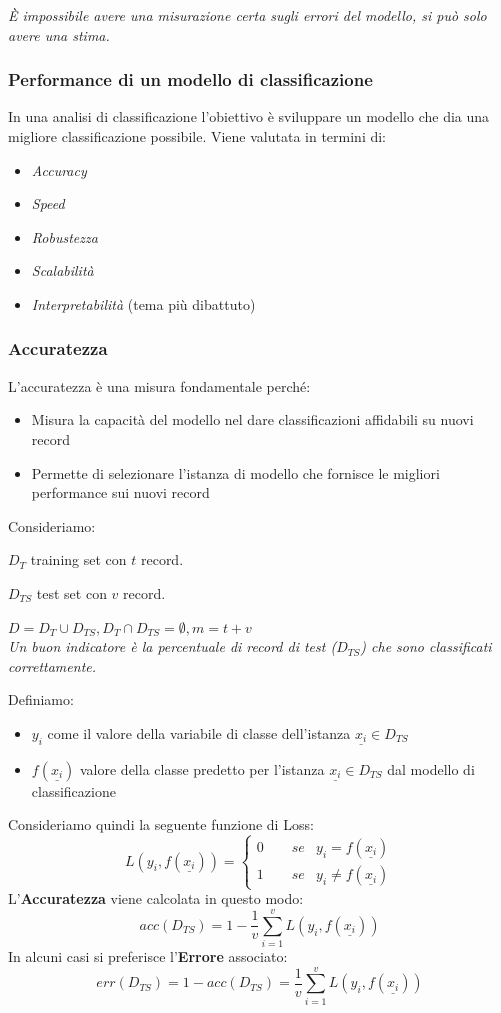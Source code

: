 \textit{\`E impossibile avere una misurazione certa sugli errori del modello, si può solo avere una stima. }

\subsubsection{Performance di un modello di classificazione}

In una analisi di classificazione l'obiettivo è sviluppare un modello che dia una migliore classificazione possibile. Viene valutata in termini di:
\begin{itemize}
	\item \textit{Accuracy}
	\item \textit{Speed}
	\item \textit{Robustezza}
	\item \textit{Scalabilità}
	\item \textit{Interpretabilità} (tema più dibattuto)
\end{itemize}

\subsubsection{Accuratezza}
L'accuratezza è una misura fondamentale perché: 
\begin{itemize}
	\item Misura la capacità del modello nel dare classificazioni affidabili su nuovi record
	\item Permette di selezionare l'istanza di modello che fornisce le migliori performance sui nuovi record
\end{itemize}
Consideriamo:

$D_T$ training set con $t$ record.

$D_{TS}$ test set con $v$ record.

$D = D_T \cup D_{TS},D_T \cap D_{TS} = \emptyset,m = t + v$\\
\textit{Un buon indicatore è la percentuale di record di test ($D_{TS}$) che sono classificati correttamente. }

Definiamo:
\begin{itemize}
	\item $y_i$ come il valore della variabile di classe dell'istanza $\underline{x_i} \in D_{TS}$
	\item $f(\underline{x_i})$ valore della classe predetto per l'istanza $\underline{x_i} \in D_{TS}$ dal modello di classificazione
\end{itemize} 
Consideriamo quindi la seguente funzione di Loss:
\[
L(y_i, f(\underline{x_i})) =  
\begin{cases}
	0 \qquad se &y_i = f(\underline{x_i}) \\
	1 \qquad se &y_i \ne f(\underline{x_i})
\end{cases}
\]
L'\textbf{Accuratezza} viene calcolata in questo modo:
\[ acc(D_{TS}) = 1 - \frac{1}{v} \sum_{i=1}^{v} L(y_i, f(\underline{x_i}))\]
In alcuni casi si preferisce l'\textbf{Errore} associato:
\[err(D_{TS}) = 1 - acc(D_{TS}) = \frac{1}{v} \sum_{i=1}^{v} L(y_i, f(\underline{x_i}))\]

